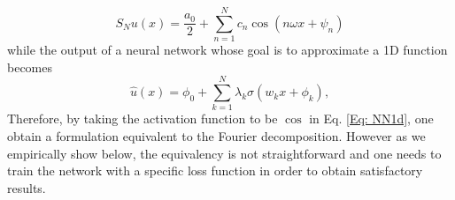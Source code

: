 \documentclass[11pt]{article}
\begin{document}
 \begin{equation}\label{Eq: fourier_shift_1d}
     S_N u(x) = \frac{a_0}{2} + \sum_{n=1}^N c_{n} \cos(n \omega x + \psi_{n})
 \end{equation}
while the output of a neural network whose goal is to approximate a 1D function becomes 
\begin{equation}\label{Eq: NN1d}
  \hat{u}(x) = \phi_0 + \sum_{k = 1}^N \lambda_{k} \sigma\left( w_{k}x + \phi_k \right),
\end{equation}
Therefore, by taking the activation function to be $\cos$ in Eq. \ref{Eq: NN1d}, one obtain a formulation equivalent to the Fourier decomposition. However as we empirically show below, the equivalency is not straightforward and one needs to train the network with a specific loss function in order to obtain satisfactory results.


\end{document}
